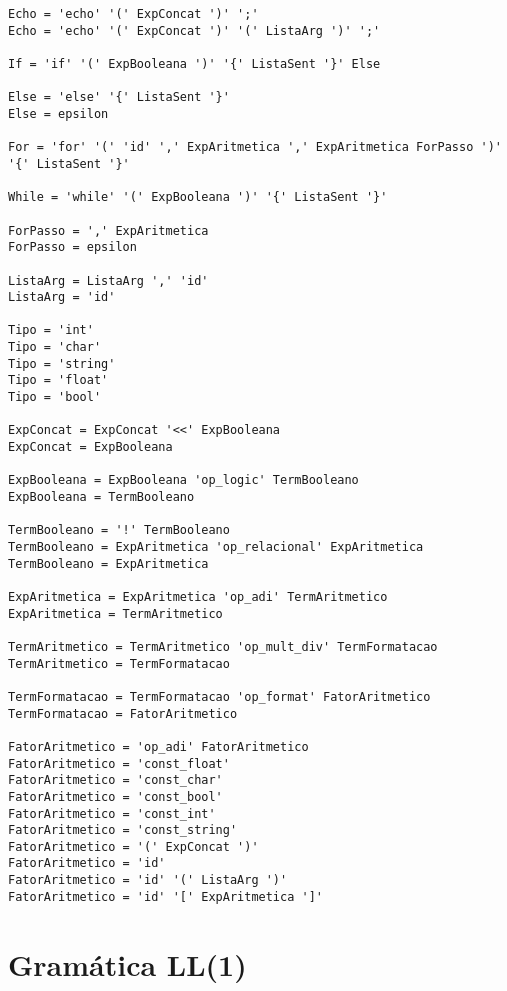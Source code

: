 \documentclass[
  12pt,				%
  oneside,			%
  a4paper,			%
  english,			%
  french,				%
  spanish,			%
  brazil,				%
]{abntex2}
\begin{document}
\begin{lstlisting}[label={code:gramatica-original},caption={Gramática
    original da linguagem de programação LisC.},style={mystyle}]
Echo = 'echo' '(' ExpConcat ')' ';'
Echo = 'echo' '(' ExpConcat ')' '(' ListaArg ')' ';'

If = 'if' '(' ExpBooleana ')' '{' ListaSent '}' Else

Else = 'else' '{' ListaSent '}'
Else = epsilon

For = 'for' '(' 'id' ',' ExpAritmetica ',' ExpAritmetica ForPasso ')' '{' ListaSent '}'

While = 'while' '(' ExpBooleana ')' '{' ListaSent '}'

ForPasso = ',' ExpAritmetica
ForPasso = epsilon

ListaArg = ListaArg ',' 'id'
ListaArg = 'id'

Tipo = 'int'
Tipo = 'char'
Tipo = 'string'
Tipo = 'float'
Tipo = 'bool'

ExpConcat = ExpConcat '<<' ExpBooleana
ExpConcat = ExpBooleana

ExpBooleana = ExpBooleana 'op_logic' TermBooleano
ExpBooleana = TermBooleano

TermBooleano = '!' TermBooleano
TermBooleano = ExpAritmetica 'op_relacional' ExpAritmetica
TermBooleano = ExpAritmetica

ExpAritmetica = ExpAritmetica 'op_adi' TermAritmetico
ExpAritmetica = TermAritmetico

TermAritmetico = TermAritmetico 'op_mult_div' TermFormatacao
TermAritmetico = TermFormatacao

TermFormatacao = TermFormatacao 'op_format' FatorAritmetico
TermFormatacao = FatorAritmetico

FatorAritmetico = 'op_adi' FatorAritmetico
FatorAritmetico = 'const_float'
FatorAritmetico = 'const_char'
FatorAritmetico = 'const_bool'
FatorAritmetico = 'const_int'
FatorAritmetico = 'const_string'
FatorAritmetico = '(' ExpConcat ')'
FatorAritmetico = 'id'
FatorAritmetico = 'id' '(' ListaArg ')'
FatorAritmetico = 'id' '[' ExpAritmetica ']'

\end{lstlisting}

\chapter{Gramática LL(1)}
\label{cha:gramatica-ll1}
\end{document}
